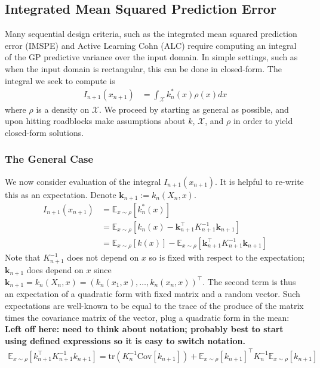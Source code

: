 \documentclass[12pt]{article}
\newcommand{\bk}{\mathbf{k}}
\begin{document}
\subsection{Integrated Mean Squared Prediction Error}
Many sequential design criteria, such as the integrated mean squared prediction error (IMSPE) and Active Learning Cohn (ALC) require 
computing an integral of the GP predictive variance over the input domain. In simple settings, such as when the input domain is 
rectangular, this can be done in closed-form. The integral we seek to compute is 
\begin{align*}
I_{n+1}(x_{n+1}) &= \int_{\mathcal{X}} k^*_n(x) \rho(x) dx
\end{align*}
where $\rho$ is a density on $\mathcal{X}$. We proceed by starting as general as possible, and upon hitting roadblocks make assumptions about $k$, $\mathcal{X}$, and 
$\rho$ in order to yield closed-form solutions. 

\subsubsection{The General Case}

We now consider evaluation of the integral $I_{n+1}(x_{n+1}) $. It is helpful to re-write this as an expectation. Denote $\bk_{n + 1} := k_n(X_n, x)$. 
\begin{align*}
I_{n+1}(x_{n+1}) &= \mathbb{E}_{x \sim \rho}\left[k_n^*(x) \right] \\
                 	 &= \mathbb{E}_{x \sim \rho}\left[k_n(x) - \bk_{n+1}^\top K_{n+1}^{-1} \bk_{n+1} \right] \\
                          &= \mathbb{E}_{x \sim \rho}[k(x)] - \mathbb{E}_{x \sim \rho}\left[\bk_{n+1}^\top K_{n+1}^{-1} \bk_{n+1} \right]
\end{align*}
Note that $K^{-1}_{n+1}$ does not depend on $x$ so is fixed with respect to the expectation; $\bk_{n+1}$ does depend on $x$ since 
$\bk_{n+1} = k_n(X_n, x) = \left(k_n(x_1, x), \dots, k_n(x_n,x) \right)^\top$. The second term is thus an expectation of a quadratic form with 
fixed matrix and a random vector. Such expectations are well-known to be equal to the trace of the produce of the matrix times the 
covariance matrix of the vector, plug a quadratic form in the mean: 
\textbf{Left off here: need to think about notation; probably best to start using defined expressions so it is easy to switch notation.}
\begin{align*}
\mathbb{E}_{x \sim \rho}\left[k_{n+1}^\top K_{n+1}^{-1} k_{n+1} \right] = \text{tr}\left(K_n^{-1}\text{Cov}\left[k_{n+1}\right]\right) + \mathbb{E}_{x \sim \rho}\left[ k_{n+1}\right]^\top K_n^{-1} \mathbb{E}_{x \sim \rho}\left[ k_{n+1}\right]
\end{align*}
\end{document}
